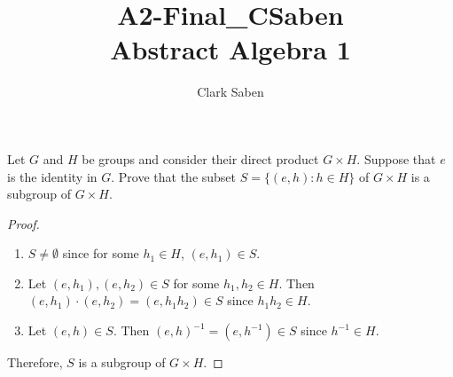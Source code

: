 \documentclass[12pt]{article}
\newenvironment{problem}[2][Problem]{\begin{trivlist}
\item[\hskip \labelsep {\bfseries #1}\hskip \labelsep {\bfseries #2.}]}{\end{trivlist}}
\begin{document}
 
 
\title{A2-Final\_CSaben\\
Abstract Algebra 1}%

\author{Clark Saben}

 
\maketitle

\begin{problem}{1}
Let $G$ and $H$ be groups and consider their direct product $G \times H$. Suppose that $e$ is the identity in $G$. Prove that the subset $S=\{(e, h): h \in H\}$ of $G \times H$ is a subgroup of $G \times H$.

\begin{proof}
	\hspace*{3mm}
	\begin{enumerate}
		\item $S \neq \emptyset$ since for some $h_1 \in H$, $(e, h_1) \in S$.
		\item Let $(e, h_1), (e, h_2) \in S$ for some $h_1, h_2 \in H$. Then $(e, h_1)\cdot(e, h_2) = (e, h_1h_2) \in S$ since $h_1h_2 \in H$.
		\item Let $(e, h) \in S$. Then $(e, h)^{-1} = (e, h^{-1}) \in S$ since $h^{-1} \in H$.
	\end{enumerate}
	Therefore, $S$ is a subgroup of $G \times H$.
	
\end{proof}
\end{problem}
\end{document}
